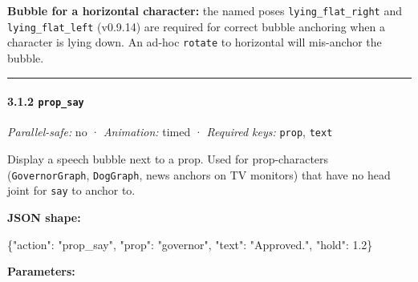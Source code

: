 \documentclass[
  12pt,
  letterpaper,
]{book}
\newenvironment{Shaded}{}{}
\newcommand{\DataTypeTok}[1]{\textcolor[rgb]{0.56,0.13,0.00}{#1}}
\newcommand{\FloatTok}[1]{\textcolor[rgb]{0.25,0.63,0.44}{#1}}
\newcommand{\FunctionTok}[1]{\textcolor[rgb]{0.02,0.16,0.49}{#1}}
\newcommand{\StringTok}[1]{\textcolor[rgb]{0.25,0.44,0.63}{#1}}
\begin{document}
\textbf{Bubble for a horizontal character:} the named poses
\texttt{lying\_flat\_right} and \texttt{lying\_flat\_left} (v0.9.14) are
required for correct bubble anchoring when a character is lying down. An
ad-hoc \texttt{rotate} to horizontal will mis-anchor the bubble.

\begin{center}\rule{0.5\linewidth}{0.5pt}\end{center}

\paragraph{\texorpdfstring{3.1.2
\texttt{prop\_say}}{3.1.2 prop\_say}}\label{prop_say}

\emph{Parallel-safe:} no · \emph{Animation:} timed · \emph{Required
keys:} \texttt{prop}, \texttt{text}

Display a speech bubble next to a prop. Used for prop-characters
(\texttt{GovernorGraph}, \texttt{DogGraph}, news anchors on TV monitors)
that have no head joint for \texttt{say} to anchor to.

\textbf{JSON shape:}

\begin{Shaded}
\begin{Highlighting}[]
\FunctionTok{\{}\DataTypeTok{"action"}\FunctionTok{:} \StringTok{"prop\_say"}\FunctionTok{,} \DataTypeTok{"prop"}\FunctionTok{:} \StringTok{"governor"}\FunctionTok{,}
 \DataTypeTok{"text"}\FunctionTok{:} \StringTok{"Approved."}\FunctionTok{,} \DataTypeTok{"hold"}\FunctionTok{:} \FloatTok{1.2}\FunctionTok{\}}
\end{Highlighting}
\end{Shaded}

\textbf{Parameters:}
\end{document}
